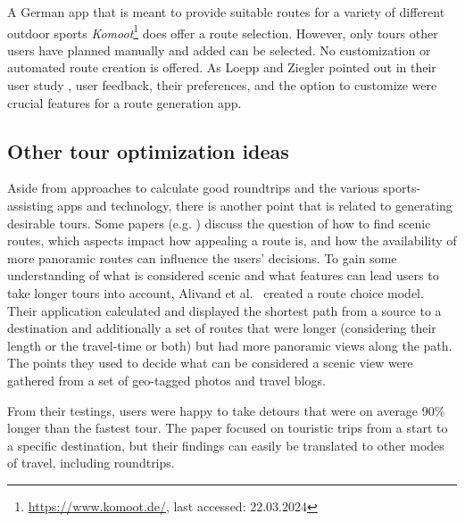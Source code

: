 A German app that is meant to provide suitable routes for a variety of different outdoor sports \textit{Komoot}\footnote{\url{https://www.komoot.de/}, last accessed: 22.03.2024} does offer a route selection. 
However, only tours other users have planned manually and added can be selected. 
No customization or automated route creation is offered. 
As Loepp and Ziegler pointed out in their user study \cite{loepp_recommending_2018}, user feedback, their preferences, and the option to customize were crucial features for a route generation app. 


\subsection{Other tour optimization ideas}
\label{subsec:otherTourOptimization}

Aside from approaches to calculate good roundtrips and the various sports-assisting apps and technology, there is another point that is related to generating desirable tours.
Some papers (e.g. \cite{alivand_analyzing_2015}) discuss the question of how to find scenic routes, which aspects impact how appealing a route is, and how the availability of more panoramic routes can influence the users' decisions.
To gain some understanding of what is considered scenic and what features can lead users to take longer tours into account, Alivand et al.\ \cite{alivand_analyzing_2015} created a route choice model.
Their application calculated and displayed the shortest path from a source to a destination and additionally a set of routes that were longer (considering their length or the travel-time or both) but had more panoramic views along the path.
The points they used to decide what can be considered a scenic view were gathered from a set of geo-tagged photos and travel blogs.

From their testings, users were happy to take detours that were on average 90\% longer than the fastest tour.
The paper focused on touristic trips from a start to a specific destination, but their findings can easily be translated to other modes of travel, including roundtrips.





